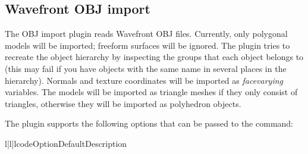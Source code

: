 
\subsection{Wavefront OBJ import}

The OBJ import plugin reads Wavefront OBJ files. Currently, only polygonal
models will be imported; freeform surfaces will be ignored. The plugin
tries to recreate the object hierarchy by inspecting the groups that each
object belongs to (this may fail if you have objects with the same name
in several places in the hierarchy). Normals and texture coordinates will
be imported as {\em facevarying} variables. The models will be imported as
triangle meshes if they only consist of triangles, otherwise they will
be imported as polyhedron objects.

The plugin supports the following options that can be passed to
the  command:

\begin{tableiii}{l|l|l}{code}{Option}{Default}{Description}
\end{tableiii}


